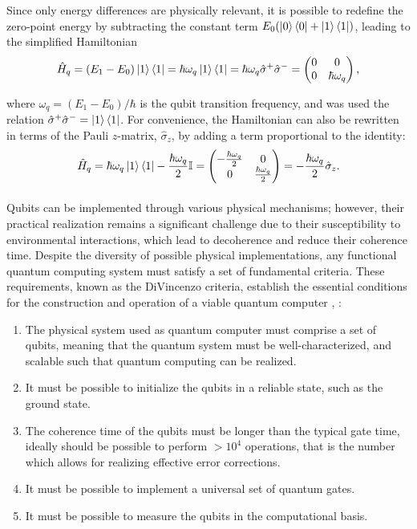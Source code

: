Since only energy differences are physically relevant, it is possible to redefine the zero-point energy by subtracting the constant term $E_0 (\ket{0} \bra{0} + \ket{1} \bra{1})$, leading to the simplified Hamiltonian
\begin{equation}\label{eq:qubithamiltonian}
    \hat{H}_q = (E_1 - E_0) \ket{1} \bra{1} = \hbar \omega_q \ket{1} \bra{1} = \hbar \omega_q \hat{\sigma}^{+} \hat{\sigma}^{-} = 
    \begin{pmatrix}
        0 & 0 \\
        0 & \hbar \omega_q
    \end{pmatrix},
\end{equation}

where $\omega_q = (E_1 - E_0)/\hbar$ is the qubit transition frequency, and was used the relation $\hat{\sigma}^{+} \hat{\sigma}^{-} = \ket{1} \bra{1}$.
For convenience, the Hamiltonian can also be rewritten in terms of the Pauli $z$-matrix, $\hat{\sigma}_z$, by adding a term proportional to the identity:
\begin{equation}
    \hat{H}_q = \hbar \omega_q \ket{1} \bra{1} - \frac{\hbar \omega_q}{2}\mathbb{I} = 
    \begin{pmatrix}
        -\frac{\hbar \omega_q}{2} & 0 \\
        0 & \frac{\hbar \omega_q}{2}
    \end{pmatrix} = -\frac{\hbar \omega_q}{2} \hat{\sigma}_z.
\end{equation}

\paragraph{}
Qubits can be implemented through various physical mechanisms; however, their practical realization remains a significant challenge due to their susceptibility to environmental interactions, which lead to decoherence and reduce their coherence time. 
Despite the diversity of possible physical implementations, any functional quantum computing system must satisfy a set of fundamental criteria. 
These requirements, known as the DiVincenzo criteria, establish the essential conditions for the construction and operation of a viable quantum computer \cite{DiVincenzo_2000}, \cite{manenti_quantum_2023}:
\begin{enumerate}
    \item The physical system used as quantum computer must comprise a set of qubits, meaning that the quantum system must be well-characterized, and scalable such that quantum
    computing can be realized.
    \item It must be possible to initialize the qubits in a reliable state, such as the ground state.
    \item The coherence time of the qubits must be longer than the typical gate time, ideally should be possible to perform $>10^4$ operations, that is the number which allows for realizing effective error corrections.
    \item It must be possible to implement a universal set of quantum gates.
    \item It must be possible to measure the qubits in the computational basis.
\end{enumerate}

